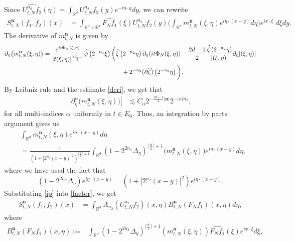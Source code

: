 \documentclass[a4paper,reqno]{amsart}
\numberwithin{equation}{section}
\newcommand{\R}{{\mathbb {R}}}
\begin{document}
	Since $\widehat{U_{t,N}^{n_2}f_2}(\eta)=\int_{\R^d}U_{t,N}^{n_2}f_2(y)e^{-i\eta\cdot y}dy$, we can rewrite
	\begin{align}\label{factor}
		S^{\mathbf{n}}_{t,N}(f_1,f_2)(x)&=\int_{\R^d\times\R^d}\widehat{F_Nf_1}(\xi)U_{t,N}^{n_2}f_2(y)\Big(\int_{\R^d}m_{t,N}^{\mathbf{n}}(\xi, \eta)e^{i\eta\cdot(x-y)}d\eta\Big)e^{ix\cdot\xi}\;d\xi dy.
	\end{align}
	The derivative of $m_{t,N}^{\mathbf{n}}$ is given by
	\begin{align*}
		\partial_\eta \big(m_{t,N}^{\mathbf{n}}(\xi, \eta)\big)&=\frac{e^{it\Phi_N(\xi,\eta)}}{|t(\xi,\eta)|^{\frac{2d-1}{2}}}\widehat{\psi}\left(2^{-n_1} \xi\right) \bigg(\widehat{\zeta}\left(2^{-n_2} \eta\right)\partial_\eta(it\Phi_N(\xi,\eta))-\frac{2d-1}{2}\frac{\widehat{\zeta}\left(2^{-n_2} \eta\right)}{|(\xi,\eta)|}\partial_\eta|(\xi,\eta)|\\
		&\hspace{4.5cm}+2^{-n_2}(\partial\widehat{\zeta})\left(2^{-n_2} \eta\right)\bigg).
	\end{align*}
	By Leibniz rule and the estimate \eqref{deri}, we get that
	\begin{align}\label{derivative}
		|\partial^\alpha_\eta \big(m_{t,N}^{\mathbf{n}}(\xi, \eta)\big)|
		&\lesssim C_{\alpha}2^{-\frac{2d-1}{2}|\mathbf{n}|}2^{-|\alpha|n_2},
	\end{align}    
	for all multi-indices $\alpha$ uniformly in $t\in E_0$. Thus, an integration by parts argument gives us
	\begin{align}\label{ip}
		&\int_{\R^d}m_{t,N}^{\mathbf{n}}(\xi, \eta)e^{i\eta\cdot(x-y)}d\eta\\&
		\nonumber=\frac{1}{(1+|2^{n_2}(x-y)|^2)^{\lceil\frac{d}{2}\rceil+1}}\int_{\R^d}(1-2^{2n_2}\Delta_\eta)^{\lceil\frac{d}{2}\rceil+1}\Big(m_{t,N}^{\mathbf{n}}(\xi, \eta)\Big)e^{i\eta\cdot(x-y)}d\eta,
	\end{align}
	where we have used the fact that
	\[(1-2^{2n_2}\Delta_\eta)e^{i\eta\cdot(x-y)}=(1+|2^{n_2}(x-y)|^2)e^{i\eta\cdot(x-y)}.\]
	Substituting \eqref{ip} into \eqref{factor}, we get
	\begin{align*}
		S^{\mathbf{n}}_{t,N}(f_1,f_2)(x)&=\int_{\mathbb{R}^{d}}A_{n_2}\left(U_{t,N}^{n_2}f_2\right)(x,\eta) B^{\mathbf{n}}_{t,N}\left(F_Nf_1\right)(x, \eta) d \eta,
	\end{align*}
	where
	\begin{align}\label{operatorB}
		B^{\mathbf{n}}_{t,N}\left(F_Nf_1\right)(x, \eta):=&\int_{\mathbb{R}^{d}} \left(1-2^{2n_2} \Delta_{\eta}\right)^{\lceil \frac{d}{2}\rceil+1}\left(m_{t,N}^{\mathbf{n}}(\xi, \eta)\right)\widehat{F_Nf_1}(\xi)e^{ix \cdot \xi} d \xi,
	\end{align}
\end{document}
